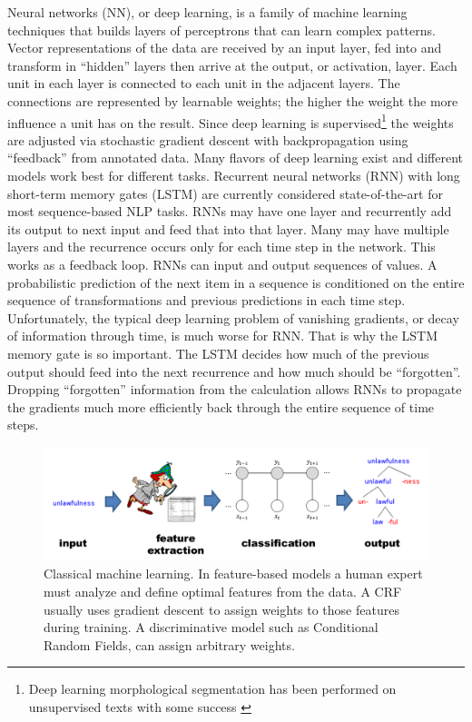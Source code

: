 \documentclass[12pt]{article}
\begin{document}
 Neural networks (NN), or deep learning, is a family of machine learning techniques that builds layers of perceptrons that can learn complex patterns. Vector representations of the data are received by an input layer, fed into and transform in ``hidden'' layers then arrive at the output, or activation, layer.  Each unit in each layer is connected to each unit in the adjacent layers. The connections are represented by learnable weights; the higher the weight the more influence a unit has on the result. Since deep learning is supervised\footnote{Deep learning morphological segmentation has been performed on unsupervised texts with some success \cite{wang_morphological_2016}} the weights are adjusted via stochastic gradient descent with backpropagation using ``feedback'' from annotated data. Many flavors of deep learning exist and different models work best for different tasks. Recurrent neural networks (RNN) \cite{Elman91} with long short-term memory gates (LSTM) \cite{Hochreiter_1997} are currently considered state-of-the-art for most sequence-based NLP tasks. RNNs may have one layer and recurrently add its output to next input and feed that into that layer. Many may have multiple layers and the recurrence occurs only for each time step in the network. This works as a feedback loop. RNNs can input and output sequences of values. A probabilistic prediction of the next item in a sequence is conditioned on the entire sequence of transformations and previous predictions in each time step. Unfortunately, the typical deep learning problem of vanishing gradients, or decay of information through time, is much worse for RNN. That is why the LSTM memory gate is so important. The LSTM decides how much of the previous output should feed into the next recurrence and how much should be ``forgotten''. Dropping ``forgotten'' information from the calculation allows RNNs to propagate the gradients much more efficiently back through the entire sequence of time steps.
 
 \begin{figure}[ht]
\label{fig:Features-ML}
\begin{center}
\includegraphics[width=0.95\columnwidth]{Features-ML.PNG}
\caption{Classical machine learning. In feature-based models a human expert must analyze and define optimal features from the data. A CRF usually uses gradient descent to assign weights to those features during training. A discriminative model such as Conditional Random Fields, can assign arbitrary weights.}
\end{center}
\end{figure}
\end{document}
